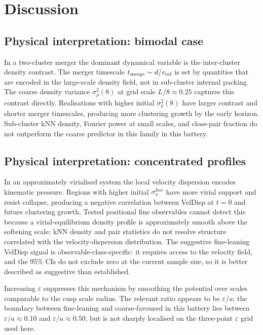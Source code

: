 \documentclass[11pt,a4paper]{article}
\newcommand{\sigrho}{\sigma^{2}_{\rho}}
\newcommand{\heps}{\varepsilon}
\begin{document}
\section{Discussion}
\label{sec:discussion}

\subsection{Physical interpretation: bimodal case}

In a two-cluster merger the dominant dynamical variable is the inter-cluster
density contrast.
The merger timescale $t_{\rm merge} \sim d/v_{\rm rel}$ is set by
quantities that are encoded in the large-scale density field, not in
sub-cluster internal packing.
The coarse density variance $\sigrho(8)$ at grid scale $L/8 \approx 0.25$
captures this contrast directly.
Realisations with higher initial $\sigrho(8)$ have larger contrast and
shorter merger timescales, producing more clustering growth by the early
horizon.
Sub-cluster kNN density, Fourier power at small scales, and close-pair
fraction do not outperform the coarse predictor in this family in this battery.

\subsection{Physical interpretation: concentrated profiles}

In an approximately virialised system the local velocity dispersion encodes
kinematic pressure.
Regions with higher initial $\sigma_v^{\rm loc}$ have more virial support
and resist collapse, producing a negative correlation between VelDisp at
$t = 0$ and future clustering growth.
Tested positional fine observables cannot detect this because a virial-equilibrium
density profile is approximately smooth above the softening scale; kNN
density and pair statistics do not resolve structure correlated with the
velocity-dispersion distribution.
The suggestive fine-leaning VelDisp signal is observable-class-specific: it requires
access to the velocity field, and the 95\% CIs do not exclude zero at the
current sample size, so it is better described as suggestive than established.

Increasing $\heps$ suppresses this mechanism by smoothing the potential
over scales comparable to the cusp scale radius.
The relevant ratio appears to be $\heps/a$; the boundary between fine-leaning
and coarse-favoured in this battery lies between $\heps/a \approx 0.10$ and
$\heps/a \approx 0.50$, but is not sharply localised on the three-point
$\heps$ grid used here.
\end{document}
